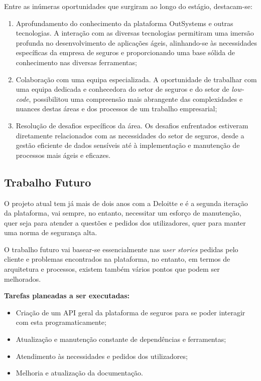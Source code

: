         Entre as inúmeras oportunidades que surgiram ao longo do estágio, destacam-se:
        \begin{enumerate}
            \item Aprofundamento do conhecimento da plataforma OutSystems e outras tecnologias. A interação com as diversas tecnologias permitiram uma imersão profunda no desenvolvimento de aplicações ágeis, alinhando-se às necessidades específicas da empresa de seguros e proporcionando uma base sólida de conhecimento nas diversas ferramentas;
            \item Colaboração com uma equipa especializada. A oportunidade de trabalhar com uma equipa dedicada e conhecedora do setor de seguros e do setor de \textit{low-code}, possibilitou uma compreensão mais abrangente das complexidades e nuances destas áreas e dos processos de um trabalho empresarial;
            \item Resolução de desafios específicos da área. Os desafios enfrentados estiveram diretamente relacionados com as necessidades do setor de seguros, desde a gestão eficiente de dados sensíveis até à implementação e manutenção de processos mais ágeis e eficazes.
        \end{enumerate}

    \subsection{Trabalho Futuro}\label{sub:trabalho_futuro}

        O projeto atual tem já mais de dois anos com a Deloitte e é a segunda iteração da plataforma, vai sempre, no entanto, necessitar um esforço de manutenção, quer seja para atender a questões e pedidos dos utilizadores, quer para manter uma norma de segurança alta.

        O trabalho futuro vai basear-se essencialmente nas \textit{user stories} pedidas pelo cliente e problemas encontrados na plataforma, no entanto, em termos de arquitetura e processos, existem também vários pontos que podem ser melhorados.

        \textbf{Tarefas planeadas a ser executadas:}
        \begin{itemize}
            \item Criação de um API geral da plataforma de seguros para se poder interagir com esta programaticamente;
            \item Atualização e manutenção constante de dependências e ferramentas;
            \item Atendimento às necessidades e pedidos dos utilizadores;
            \item Melhoria e atualização da documentação.
        \end{itemize}

